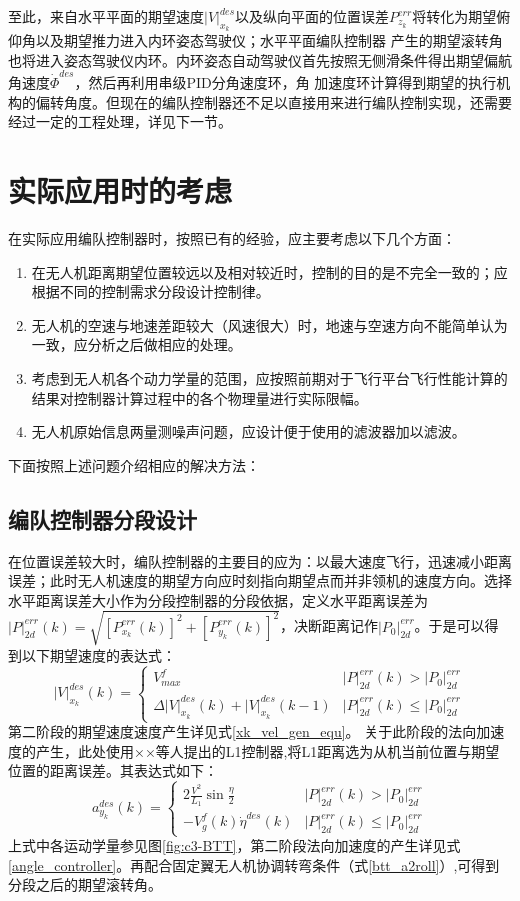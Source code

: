 至此，来自水平平面的期望速度$|V|_{x_k}^{des}$以及纵向平面的位置误差$P_{z_k}^{err}$将转化为期望俯仰角以及期望推力进入内环姿态驾驶仪；水平平面编队控制器
产生的期望滚转角也将进入姿态驾驶仪内环。内环姿态自动驾驶仪首先按照无侧滑条件得出期望偏航角速度$\dot{\Phi}^{des}$，然后再利用串级PID分角速度环，角
加速度环计算得到期望的执行机构的偏转角度。但现在的编队控制器还不足以直接用来进行编队控制实现，还需要经过一定的工程处理，详见下一节。
\section{实际应用时的考虑}
在实际应用编队控制器时，按照已有的经验，应主要考虑以下几个方面：
\begin{enumerate}
    \item 在无人机距离期望位置较远以及相对较近时，控制的目的是不完全一致的；应根据不同的控制需求分段设计控制律。
    \item 无人机的空速与地速差距较大（风速很大）时，地速与空速方向不能简单认为一致，应分析之后做相应的处理。
    \item 考虑到无人机各个动力学量的范围，应按照前期对于飞行平台飞行性能计算的结果对控制器计算过程中的各个物理量进行实际限幅。
    \item 无人机原始信息两量测噪声问题，应设计便于使用的滤波器加以滤波。
\end{enumerate}
下面按照上述问题介绍相应的解决方法：

\subsection{编队控制器分段设计} 
在位置误差较大时，编队控制器的主要目的应为：以最大速度飞行，迅速减小距离误差；此时无人机速度的期望方向应时刻指向期望点而并非领机的速度方向。选择水平距离误差大小作为分段控制器的分段依据，定义水平距离误差为$|P|_{2d}^{err}(k)=\sqrt{[P_{x_k}^{err}(k)]^2+[P_{y_k}^{err}(k)]^2}$，决断距离记作$|P_0|_{2d}^{err}$。于是可以得到以下期望速度的表达式：
\begin{equation}
    |V|_{x_k}^{des}(k)=
    \begin{cases}
        V_{max}^f& |P|_{2d}^{err}(k)>|P_0|_{2d}^{err}\\
        \Delta{|V|}_{x_k}^{des}(k)+{|V|}_{x_k}^{des}(k-1)& |P|_{2d}^{err}(k)\leq|P_0|_{2d}^{err}
    \end{cases}
    \end{equation}
第二阶段的期望速度速度产生详见式\ref{xk_vel_gen_equ}。
关于此阶段的法向加速度的产生，此处使用××等人提出的L1控制器,将L1距离选为从机当前位置与期望位置的距离误差。其表达式如下：
\begin{equation}
    a_{y_k}^{des}(k)=
    \begin{cases}
        2\frac{V^2}{L_1}\sin{\frac{\eta}{2}}& |P|_{2d}^{err}(k)>|P_0|_{2d}^{err}\\
        -V_g^{f}(k)\dot{\eta}^{des}(k)& |P|_{2d}^{err}(k)\leq|P_0|_{2d}^{err}
    \end{cases}
    \end{equation}
上式中各运动学量参见图\ref{fig:c3-BTT}，第二阶段法向加速度的产生详见式\ref{angle_controller}。再配合固定翼无人机协调转弯条件（式\ref{btt_a2roll}）,可得到分段之后的期望滚转角。
